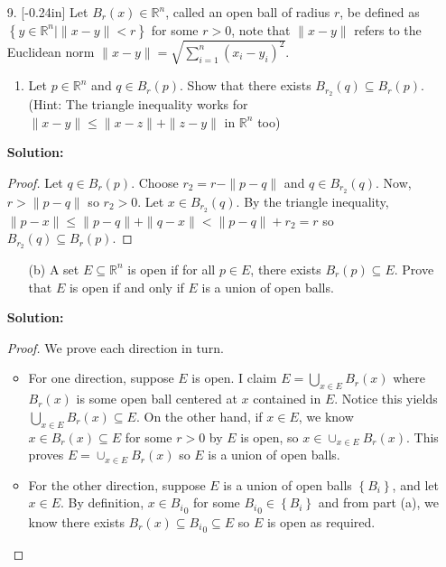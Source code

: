 \documentclass[letterpaper,12pt]{article}
\newcommand{\set}[1]{\left\{ #1 \right\}}
\theoremstyle{definition}
\begin{document}
\pagebreak
\begin{enumerate}
    \item[9.] \reversemarginpar{}[-0.24in] 
 Let $B_r(x) \in \mathbb{R}^n$, called an open ball of radius $r$, be defined as $\set{y \in \mathbb{R}^n | \| x-y \| < r}$ for some $r > 0$, note that $\| x-y \|$ refers to the Euclidean norm $\| x-y \| = \sqrt{\sum_{i=1}^n (x_i - y_i)^2}$. \begin{enumerate}
        \item Let $p \in \mathbb{R}^n$ and $q \in B_r(p)$. Show that there exists $B_{r_2}(q) \subseteq B_r(p)$. (Hint: The triangle inequality works for $\|x - y\| \leq \|x - z\| + \|z -y \|$ in $\mathbb{R}^n$ too)
    \end{enumerate}
      \begin{mdframed}
            \textbf{Solution:}
            \begin{proof}
                Let $q \in B_r(p)$. Choose $r_2 = r - \| p-q\|$ and $q \in B_{r_2}(q)$. Now, $r > \| p-q\|$ so $r_2 > 0$. Let $x \in B_{r_2}(q)$. By the triangle inequality, $\|p-x \| \leq \|p-q\| + \|q-x\| < \|p-q\| + r_2 = r$ so $B_{r_2}(q) \subseteq B_r(p)$. 
            \end{proof}
        \end{mdframed}
\end{enumerate}
\pagebreak
\begin{enumerate}
    \item[] \begin{enumerate}
        \item[(b)] A set $E \subseteq \mathbb{R}^n$ is open if for all $p \in E$, there exists $B_r(p) \subseteq E$. Prove that $E$ is open if and only if $E$ is a union of open balls.
    \end{enumerate}
      \begin{mdframed}
            \textbf{Solution:}
            \begin{proof}
               We prove each direction in turn. \begin{itemize}
                    \item For one direction, suppose $E$ is open. I claim $E = \bigcup_{x \in E} B_r(x)$ where $B_r(x)$ is some open ball centered at $x$ contained in $E$. Notice this yields $\bigcup_{x \in E} B_r(x) \subseteq E$. On the other hand, if $x \in E$, we know $x \in B_r(x) \subseteq E$ for some $r > 0$ by $E$ is open, so $x \in \cup_{x \in E} B_r(x)$. This proves $E = \cup_{x \in E} B_r(x)$ so $E$ is a union of open balls.
                    \item For the other direction, suppose $E$ is a union of open balls $\set{B_i}$, and let $x \in E$. By definition, $x \in {B_i}_0$ for some ${B_i}_0 \in \set{B_i}$ and from part (a), we know there exists $B_r(x) \subseteq {B_i}_0 \subseteq E$ so $E$ is open as required.
                \end{itemize}
            \end{proof}
        \end{mdframed}
\end{enumerate}
\end{document}
